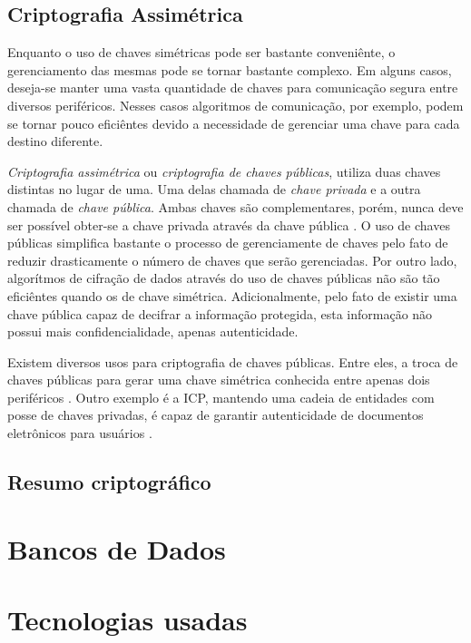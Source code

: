 \subsection{Criptografia Assimétrica}
Enquanto o uso de chaves simétricas pode ser bastante conveniênte, o gerenciamento das mesmas pode se tornar bastante complexo. Em alguns casos, 
deseja-se manter uma vasta quantidade de chaves para comunicação segura entre diversos periféricos. Nesses casos algoritmos de comunicação, por exemplo, podem se tornar pouco eficiêntes devido a 
necessidade de gerenciar uma chave para cada destino diferente.

\textit{Criptografia assimétrica} ou \textit{criptografia de chaves públicas}, utiliza duas chaves distintas no lugar de uma. Uma delas chamada de \textit{chave privada} e a outra chamada de \textit{chave pública}. 
Ambas chaves são complementares, porém, nunca deve ser possível obter-se a chave privada através da chave pública \cite{Planning}. O uso de chaves públicas simplifica bastante o processo de gerenciamente de chaves 
pelo fato de reduzir drasticamente o número de chaves que serão gerenciadas. Por outro lado, algorítmos de cifração de dados através do uso de chaves públicas não são tão eficiêntes quando os de chave simétrica. 
Adicionalmente, pelo fato de existir uma chave pública capaz de decifrar a informação protegida, esta informação não possui mais confidencialidade, apenas autenticidade.

Existem diversos usos para criptografia de chaves públicas. Entre eles, a troca de chaves públicas para gerar uma chave simétrica conhecida entre apenas dois periféricos \cite{KeyAgreement}. Outro exemplo é 
a \ac{ICP}, mantendo uma cadeia de entidades com posse de chaves privadas, é capaz de garantir autenticidade de documentos eletrônicos para usuários \cite{Planning}. 

\subsection{Resumo criptográfico}

\section{Bancos de Dados}

\section{Tecnologias usadas}

